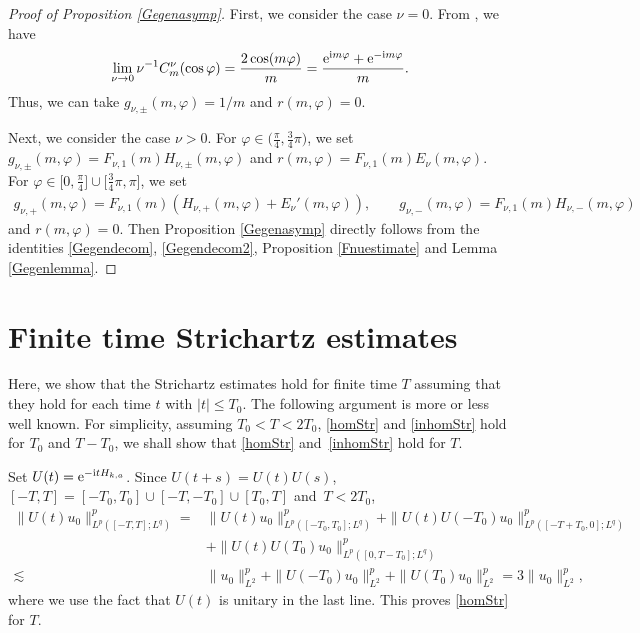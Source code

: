 \documentclass[10pt,a4paper]{amsart}
\numberwithin{equation}{section}
\def\f{\varphi}
\def\n{\nu}
\begin{document}
\begin{proof}[Proof of Proposition \ref{Gegenasymp}]
First, we consider the case $\n=0$. From \cite[equation~(4.28)]{BKO}, we have
\begin{align*}
\lim_{\n\to 0}\n^{-1}C_m^{\n}(\cos\f)=\frac{2\cos (m\f)}{m}=\frac{{\rm e}^{{\rm i}m\f}+{\rm e}^{-{\rm i}m\f}}{m}.
\end{align*}
Thus, we can take $g_{\n,\pm}(m,\f)=1/m$ and $r(m,\f)=0$.

Next, we consider the case $\n>0$. For $\f\in \bigl(\frac{\pi}{4}, \frac{3}{4}\pi\bigr)$, we set $g_{\n,\pm}(m,\f)=F_{\n,1}(m)H_{\n,\pm}(m,\f)$ and $r(m,\f)=F_{\n,1}(m)E_{\n}(m,\f)$. For $\f\in \bigl[0,\frac{\pi}{4}\bigr]\cup \bigl[\frac{3}{4}\pi,\pi\bigr]$, we set
\begin{align*}
g_{\n,+}(m,\f)=F_{\n,1}(m)(H_{\n,+}(m,\f)+E_{\n}'(m,\f)),\qquad g_{\n,-}(m,\f)=F_{\n,1}(m)H_{\n,-}(m,\f)
\end{align*}
and $r(m,\f)=0$. Then Proposition \ref{Gegenasymp} directly follows from the identities \eqref{Gegendecom}, \eqref{Gegendecom2}, Proposition \ref{Fnuestimate} and Lemma \ref{Gegenlemma}.
\end{proof}

\section{Finite time Strichartz estimates}\label{finitetime}

Here, we show that the Strichartz estimates hold for finite time $T$ assuming that they hold for each time $t$ with $|t|\leq T_0$.
The following argument is more or less well known.
For simplicity, assuming $T_0<T<2T_0$, \eqref{homStr} and \eqref{inhomStr} hold for $T_0$ and $T-T_0$, we shall show that \eqref{homStr} and~\eqref{inhomStr} hold for $T$.

Set $U(t)={\rm e}^{-{\rm i}tH_{k,a}}$.
Since $U(t+s)=U(t)U(s)$, $[-T,T]=[-T_0,T_0]\cup [-T,-T_0]\cup [T_0,T]$ and~${T<2T_0}$,
\begin{align*}
\|U(t)u_0\|_{L^p([-T,T];L^q)}^p={}&\|U(t)u_0\|_{L^p([-T_0,T_0];L^q)}^p+\|U(t)U(-T_0)u_0\|_{L^p([-T+T_0,0];L^q)}^p\\
&+\|U(t)U(T_0)u_0\|_{L^p([0,T-T_0];L^q)}^p\\
\lesssim{}&\|u_0\|_{L^2}^p+\|U(-T_0)u_0\|_{L^2}^p+\|U(T_0)u_0\|_{L^2}^p=3\|u_0\|_{L^2}^p,
\end{align*}
where we use the fact that $U(t)$ is unitary in the last line. This proves \eqref{homStr} for $T$.
\end{document}
